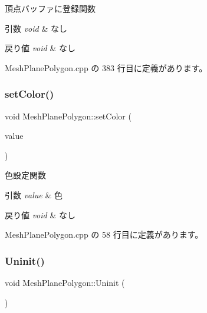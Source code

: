頂点バッファに登録関数 


\begin{DoxyParams}{引数}
{\em void} & なし \\
\hline
\end{DoxyParams}

\begin{DoxyRetVals}{戻り値}
{\em void} & なし \\
\hline
\end{DoxyRetVals}


 Mesh\+Plane\+Polygon.\+cpp の 383 行目に定義があります。

\mbox{\label{class_mesh_plane_polygon_aa722084072913bad01fc86add2777a47}} 
\subsubsection{\texorpdfstring{set\+Color()}{setColor()}}
{\footnotesize\ttfamily void Mesh\+Plane\+Polygon\+::set\+Color (\begin{DoxyParamCaption}\item[{\mbox{\hyperlink{_vector3_d_8h_a680c30c4a07d86fe763c7e01169cd6cc}{X\+Color4}}}]{value }\end{DoxyParamCaption})}



色設定関数 


\begin{DoxyParams}{引数}
{\em value} & 色 \\
\hline
\end{DoxyParams}

\begin{DoxyRetVals}{戻り値}
{\em void} & なし \\
\hline
\end{DoxyRetVals}


 Mesh\+Plane\+Polygon.\+cpp の 58 行目に定義があります。

\mbox{\label{class_mesh_plane_polygon_a05ece33c0296716631bd576b17f07817}} 
\subsubsection{\texorpdfstring{Uninit()}{Uninit()}}
{\footnotesize\ttfamily void Mesh\+Plane\+Polygon\+::\+Uninit (\begin{DoxyParamCaption}{ }\end{DoxyParamCaption})}



